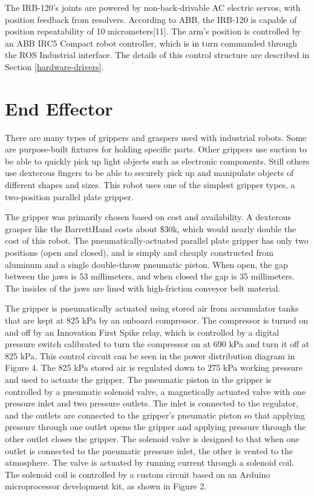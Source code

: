 \documentclass[]{cwru} %
\begin{document}
The IRB-120's joints are powered by non-back-drivable AC electric
servos, with position feedback from resolvers. According to ABB, the
IRB-120 is capable of position repeatability of 10 micrometers{[}11{]}.
The arm's position is controlled by an ABB IRC5 Compact robot
controller, which is in turn commanded through the ROS Industrial
interface. The details of this control structure are described in Section
\ref{hardware-drivers}.

\section{End Effector}

There are many types of grippers and graspers used with industrial
robots. Some are purpose-built fixtures for holding specific parts.
Other grippers use suction to be able to quickly pick up light objects
such as electronic components. Still others use dexterous fingers to be
able to securely pick up and manipulate objects of different shapes and
sizes. This robot uses one of the simplest gripper types, a two-position
parallel plate gripper.

The gripper was primarily chosen based on cost and availability. A
dexterous grasper like the BarrettHand costs about \$30k, which would
nearly double the cost of this robot. The pneumatically-actuated
parallel plate gripper has only two positions (open and closed), and is
simply and cheaply constructed from aluminum and a single double-throw
pneumatic piston. When open, the gap between the jaws is 53 millimeters,
and when closed the gap is 35 millimeters. The insides of the jaws are
lined with high-friction conveyor belt material.

The gripper is pneumatically actuated using stored air from accumulator
tanks that are kept at 825 kPa by an onboard compressor. The compressor
is turned on and off by an Innovation First Spike relay, which is
controlled by a digital pressure switch calibrated to turn the
compressor on at 690 kPa and turn it off at 825 kPa. This control
circuit can be seen in the power distribution diagram in Figure 4. The
825 kPa stored air is regulated down to 275 kPa working pressure and
used to actuate the gripper. The pneumatic piston in the gripper is
controlled by a pneumatic solenoid valve, a magnetically actuated valve
with one pressure inlet and two pressure outlets. The inlet is connected
to the regulator, and the outlets are connected to the gripper's
pneumatic piston so that applying pressure through one outlet opens the
gripper and applying pressure through the other outlet closes the
gripper. The solenoid valve is designed to that when one outlet is
connected to the pneumatic pressure inlet, the other is vented to the
atmosphere. The valve is actuated by running current through a solenoid
coil. The solenoid coil is controlled by a custom circuit based on an
Arduino microprocessor development kit, as shown in Figure 2.
\end{document}
